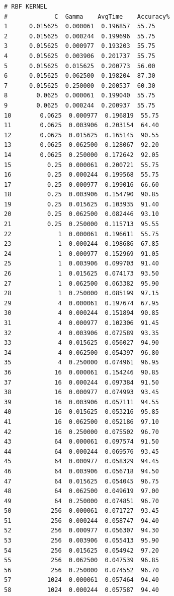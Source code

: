 \documentclass[letterpaper,doc,notimes]{apa6}
\begin{document}
\begin{verbatim}
# RBF KERNEL
#             C  Gamma    AvgTime    Accuracy%
1      0.015625  0.000061  0.196857  55.75
2      0.015625  0.000244  0.199696  55.75
3      0.015625  0.000977  0.193203  55.75
4      0.015625  0.003906  0.201737  55.75
5      0.015625  0.015625  0.200773  56.00
6      0.015625  0.062500  0.198204  87.30
7      0.015625  0.250000  0.200537  60.30
8        0.0625  0.000061  0.199040  55.75
9        0.0625  0.000244  0.200937  55.75
10        0.0625  0.000977  0.196819  55.75
11        0.0625  0.003906  0.203154  64.40
12        0.0625  0.015625  0.165145  90.55
13        0.0625  0.062500  0.128067  92.20
14        0.0625  0.250000  0.172642  92.05
15          0.25  0.000061  0.200721  55.75
16          0.25  0.000244  0.199568  55.75
17          0.25  0.000977  0.199016  66.60
18          0.25  0.003906  0.154790  90.85
19          0.25  0.015625  0.103935  91.40
20          0.25  0.062500  0.082446  93.10
21          0.25  0.250000  0.115713  95.55
22             1  0.000061  0.196611  55.75
23             1  0.000244  0.198686  67.85
24             1  0.000977  0.152969  91.05
25             1  0.003906  0.099703  91.40
26             1  0.015625  0.074173  93.50
27             1  0.062500  0.063382  95.90
28             1  0.250000  0.085199  97.15
29             4  0.000061  0.197674  67.95
30             4  0.000244  0.151894  90.85
31             4  0.000977  0.102306  91.45
32             4  0.003906  0.072589  93.35
33             4  0.015625  0.056027  94.90
34             4  0.062500  0.054397  96.80
35             4  0.250000  0.074961  96.95
36            16  0.000061  0.154246  90.85
37            16  0.000244  0.097384  91.50
38            16  0.000977  0.074993  93.45
39            16  0.003906  0.057111  94.55
40            16  0.015625  0.053216  95.85
41            16  0.062500  0.052186  97.10
42            16  0.250000  0.075502  96.70
43            64  0.000061  0.097574  91.50
44            64  0.000244  0.069576  93.45
45            64  0.000977  0.058329  94.45
46            64  0.003906  0.056718  94.50
47            64  0.015625  0.054045  96.75
48            64  0.062500  0.049619  97.00
49            64  0.250000  0.074851  96.70
50           256  0.000061  0.071727  93.45
51           256  0.000244  0.058747  94.40
52           256  0.000977  0.056307  94.30
53           256  0.003906  0.055413  95.90
54           256  0.015625  0.054942  97.20
55           256  0.062500  0.047539  96.85
56           256  0.250000  0.074552  96.70
57          1024  0.000061  0.057464  94.40
58          1024  0.000244  0.057587  94.40

\end{verbatim}
\end{document}
